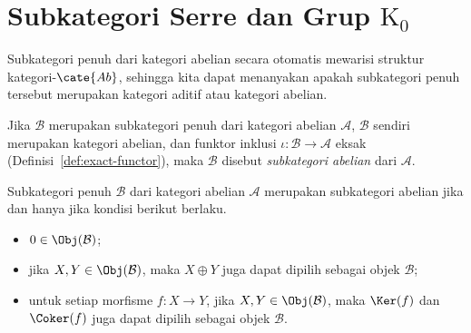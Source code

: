 
\section{Subkategori Serre dan Grup \texorpdfstring{$\mathrm{K}_0$}{K0}}\label{sec:Serre-subcat}
\hypertarget{o014.aljabr2.chapter2.serre-subcategories-and-k0-groups}{ }

Subkategori penuh dari kategori abelian secara otomatis mewarisi struktur
kategori-$\cate{Ab}$, sehingga kita dapat menanyakan apakah subkategori penuh
tersebut merupakan kategori aditif atau kategori abelian.

\begin{definisi}
Jika $\mathcal{B}$ merupakan subkategori penuh dari kategori abelian $\mathcal{A}$,
$\mathcal{B}$ sendiri merupakan kategori abelian, dan funktor inklusi
$\iota:\mathcal{B}\to\mathcal{A}$ eksak (Definisi~\ref{def:exact-functor}), maka
$\mathcal{B}$ disebut \emph{subkategori abelian} dari $\mathcal{A}$.
\end{definisi}

\begin{proposisi}\label{prop:Abel-subcat}
Subkategori penuh $\mathcal{B}$ dari kategori abelian $\mathcal{A}$ merupakan
subkategori abelian jika dan hanya jika kondisi berikut berlaku.
\begin{itemize}
	\item $0\in\Obj(\mathcal{B})$;
	\item jika $X,Y\in\Obj(\mathcal{B})$, maka $X\oplus Y$ juga dapat dipilih
	sebagai objek $\mathcal{B}$;
	\item untuk setiap morfisme $f:X\to Y$, jika $X,Y\in\Obj(\mathcal{B})$, maka
		$\Ker(f)$ dan $\Coker(f)$ juga dapat dipilih sebagai objek $\mathcal{B}$.
\end{itemize}
\end{proposisi}

